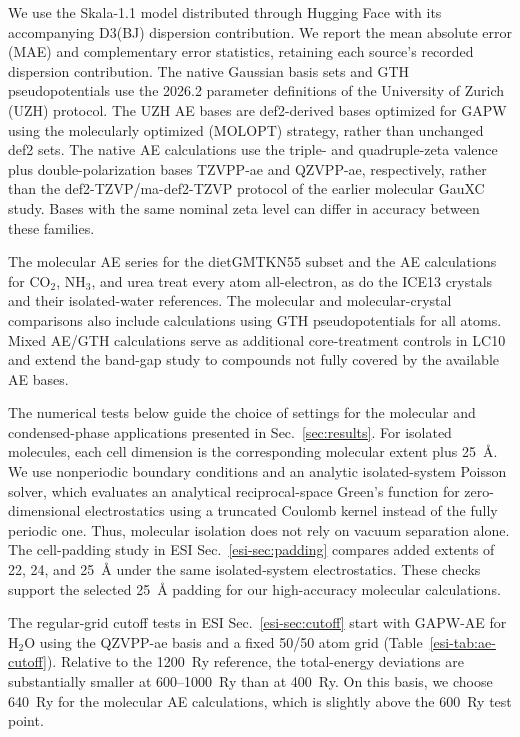 \documentclass[10pt,a4paper,twocolumn]{article}
\begin{document}
We use the Skala-1.1 model distributed through Hugging Face\cite{SkalaModelCard} with its accompanying D3(BJ) dispersion contribution.\cite{Skala2025,Grimme2011D3BJ} We report the mean absolute error (MAE) and complementary error statistics, retaining each source's recorded dispersion contribution. The native Gaussian basis sets and GTH pseudopotentials use the 2026.2 parameter definitions of the University of Zurich (UZH) protocol.\cite{Mirhosseini2026UZH} The UZH AE bases are def2-derived bases optimized for GAPW using the molecularly optimized (MOLOPT) strategy, rather than unchanged def2 sets.\cite{Weigend2005,VandeVondele2007,Mirhosseini2026UZH} The native AE calculations use the triple- and quadruple-zeta valence plus double-polarization bases TZVPP-ae and QZVPP-ae, respectively, rather than the def2-TZVP/ma-def2-TZVP protocol of the earlier molecular GauXC study.\cite{Poeschel2026MolecularSkala} Bases with the same nominal zeta level can differ in accuracy between these families.

The molecular AE series for the dietGMTKN55 subset and the AE calculations for CO$_2$, NH$_3$, and urea treat every atom all-electron, as do the ICE13 crystals and their isolated-water references. The molecular and molecular-crystal comparisons also include calculations using GTH pseudopotentials for all atoms. Mixed AE/GTH calculations serve as additional core-treatment controls in LC10 and extend the band-gap study to compounds not fully covered by the available AE bases.

The numerical tests below guide the choice of settings for the molecular and condensed-phase applications presented in Sec.~\ref{sec:results}. For isolated molecules, each cell dimension is the corresponding molecular extent plus 25~\AA{}. We use nonperiodic boundary conditions and an analytic isolated-system Poisson solver, which evaluates an analytical reciprocal-space Green's function for zero-dimensional electrostatics using a truncated Coulomb kernel instead of the fully periodic one. Thus, molecular isolation does not rely on vacuum separation alone. The cell-padding study in ESI Sec.~\ref{esi-sec:padding} compares added extents of 22, 24, and 25~\AA{} under the same isolated-system electrostatics. These checks support the selected 25~\AA{} padding for our high-accuracy molecular calculations.

The regular-grid cutoff tests in ESI Sec.~\ref{esi-sec:cutoff} start with GAPW-AE for H$_2$O using the QZVPP-ae basis and a fixed 50/50 atom grid (Table~\ref{esi-tab:ae-cutoff}). Relative to the 1200~Ry reference, the total-energy deviations are substantially smaller at 600--1000~Ry than at 400~Ry. On this basis, we choose 640~Ry for the molecular AE calculations, which is slightly above the 600~Ry test point.
\end{document}
